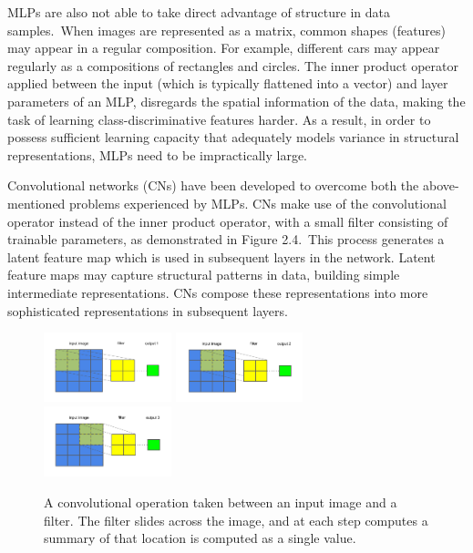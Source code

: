 \noindent MLPs are also not able to take direct advantage of structure in data samples.\ When images are represented as a matrix, common shapes (features) may appear in a regular composition. For example, different cars may appear regularly as a compositions of rectangles and circles. The inner product operator applied between the input (which is typically flattened into a vector) and layer parameters of an MLP, disregards the spatial information of the data, making the task of learning class-discriminative features harder. As a result, in order to possess sufficient learning capacity that adequately models variance in structural representations, MLPs need to be impractically large. \par

\noindent Convolutional networks (CNs) have been developed to overcome both the above-mentioned problems experienced by MLPs. CNs make use of the convolutional operator instead of the inner product operator, with a small filter consisting of trainable parameters, as demonstrated in Figure 2.4.\ This process generates a latent feature map which is used in subsequent layers in the network. Latent feature maps may capture structural patterns in data, building simple intermediate representations. CNs compose these representations into more sophisticated representations in subsequent layers. \par 

\begin{figure}[H]
	\centering
	\includegraphics[width=0.33\textwidth, height=0.25\textwidth]{convolution1}\hfill
	\includegraphics[width=0.33\textwidth, height=0.25\textwidth]{convolution2}\hfill
	\includegraphics[width=0.33\textwidth, height=0.25\textwidth]{convolution3}
	\caption{A convolutional operation taken between an input image and a filter. The filter slides across the image, and at each step computes a summary of that location is computed as a single value.}
\end{figure}

